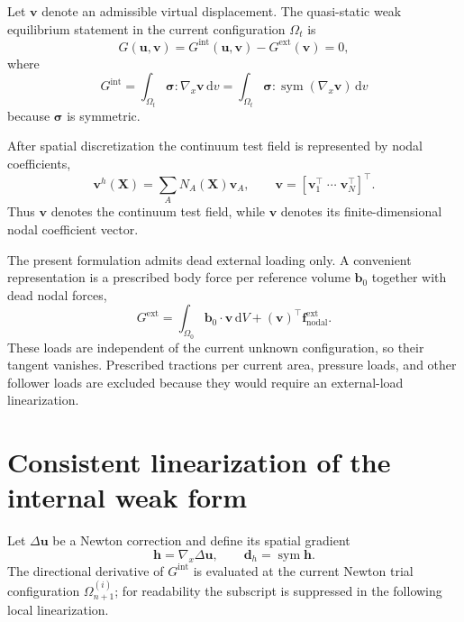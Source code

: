 \documentclass[11pt,a4paper]{article}
\newcommand{\bs}[1]{\boldsymbol{#1}}
\newcommand{\dd}{\mathrm{d}}
\newcommand{\sym}{\operatorname{sym}}
\newcommand{\sig}{\bs{\sigma}}
\newcommand{\vct}[1]{\mathbf{#1}}
\begin{document}
Let $\bs{v}$ denote an admissible virtual displacement. The quasi-static weak equilibrium statement in the current configuration $\Omega_t$ is
\begin{equation}
G(\bs{u},\bs{v})
=G^{\mathrm{int}}(\bs{u},\bs{v})
-G^{\mathrm{ext}}(\bs{v})
=0,
\label{eq:weak-total}
\end{equation}
where
\begin{equation}
G^{\mathrm{int}}
=
\int_{\Omega_t}
\sig:\nabla_x\bs{v}\,\dd v
=
\int_{\Omega_t}
\sig:\sym(\nabla_x\bs{v})\,\dd v
\label{eq:weak-int}
\end{equation}
because $\sig$ is symmetric.

After spatial discretization the continuum test field is represented by nodal coefficients,
\begin{equation}
\bs v^h(\bs X)=\sum_A N_A(\bs X)\vct v_A,
\qquad
\vct v=[\vct v_1^\top\;\cdots\;\vct v_N^\top]^\top.
\label{eq:test-coefficients}
\end{equation}
Thus $\bs v$ denotes the continuum test field, while $\vct v$ denotes its finite-dimensional nodal coefficient vector.

The present formulation admits dead external loading only. A convenient representation is a prescribed body force per reference volume $\bs b_0$ together with dead nodal forces,
\begin{equation}
G^{\mathrm{ext}}
=
\int_{\Omega_0}\bs b_0\cdot\bs v\,\dd V
+(\vct v)^\top\vct f^{\mathrm{ext}}_{\mathrm{nodal}}.
\end{equation}
These loads are independent of the current unknown configuration, so their tangent vanishes. Prescribed tractions per current area, pressure loads, and other follower loads are excluded because they would require an external-load linearization.

\section{Consistent linearization of the internal weak form}
\label{sec:linearization}

Let $\Delta\bs{u}$ be a Newton correction and define its spatial gradient
\begin{equation}
\bs{h}=\nabla_x\Delta\bs{u},
\qquad
\bs{d}_h=\sym\bs{h}.
\end{equation}
The directional derivative of $G^{\mathrm{int}}$ is evaluated at the current Newton trial configuration $\Omega_{n+1}^{(i)}$; for readability the subscript is suppressed in the following local linearization.
\end{document}
